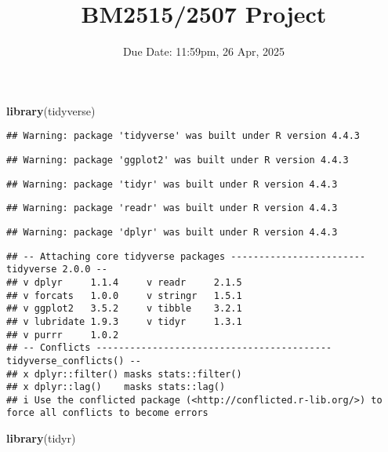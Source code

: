 \documentclass[
]{article}
\title{BM2515/2507 Project}
\author{}
\date{\vspace{-2.5em}Due Date: 11:59pm, 26 Apr, 2025}
\newenvironment{Shaded}{\begin{snugshade}}{\end{snugshade}}
\newcommand{\FunctionTok}[1]{\textcolor[rgb]{0.13,0.29,0.53}{\textbf{#1}}}
\newcommand{\NormalTok}[1]{#1}
\begin{document}
\maketitle

\begin{Shaded}
\begin{Highlighting}[]
\FunctionTok{library}\NormalTok{(tidyverse)}
\end{Highlighting}
\end{Shaded}

\begin{verbatim}
## Warning: package 'tidyverse' was built under R version 4.4.3
\end{verbatim}

\begin{verbatim}
## Warning: package 'ggplot2' was built under R version 4.4.3
\end{verbatim}

\begin{verbatim}
## Warning: package 'tidyr' was built under R version 4.4.3
\end{verbatim}

\begin{verbatim}
## Warning: package 'readr' was built under R version 4.4.3
\end{verbatim}

\begin{verbatim}
## Warning: package 'dplyr' was built under R version 4.4.3
\end{verbatim}

\begin{verbatim}
## -- Attaching core tidyverse packages ------------------------ tidyverse 2.0.0 --
## v dplyr     1.1.4     v readr     2.1.5
## v forcats   1.0.0     v stringr   1.5.1
## v ggplot2   3.5.2     v tibble    3.2.1
## v lubridate 1.9.3     v tidyr     1.3.1
## v purrr     1.0.2     
## -- Conflicts ------------------------------------------ tidyverse_conflicts() --
## x dplyr::filter() masks stats::filter()
## x dplyr::lag()    masks stats::lag()
## i Use the conflicted package (<http://conflicted.r-lib.org/>) to force all conflicts to become errors
\end{verbatim}

\begin{Shaded}
\begin{Highlighting}[]
\FunctionTok{library}\NormalTok{(tidyr)}
\end{Highlighting}
\end{Shaded}
\end{document}
